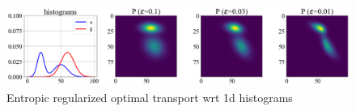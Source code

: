 \documentclass[11pt]{article}
\begin{document}
\begin{center} 
\begin{figure}[h!]
    \includegraphics[width=\textwidth]{assets/plt_sinkhorn_vary_epsilon} 
    \caption{Entropic regularized optimal transport wrt 1d histograms}
    \label{fig:plt_sinkhorn_vary_epsilon}
\end{figure}
\end{center} 
 

\newpage
\printbibliography 
\end{document}
